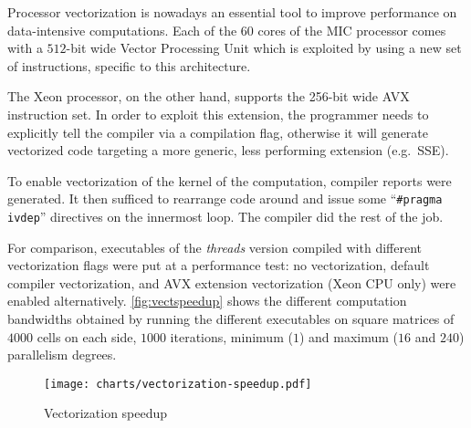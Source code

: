 \documentclass[a4paper,11pt]{article}
\newcommand{\code}[1]{\texttt{#1}}
\begin{document}
Processor vectorization is nowadays an essential tool to improve performance on data-intensive computations. Each of the $60$ cores of the MIC processor comes with a $512$-bit wide Vector Processing Unit which is exploited by using a new set of instructions, specific to this architecture.

The Xeon processor, on the other hand, supports the 256-bit wide AVX instruction set. In order to exploit this extension, the programmer needs to explicitly tell the compiler via a compilation flag, otherwise it will generate vectorized code targeting a more generic, less performing extension (e.g.\ SSE).

To enable vectorization of the kernel of the computation, compiler reports were generated. It then sufficed to rearrange code around and issue some ``\code{\#pragma ivdep}'' directives on the innermost loop. The compiler did the rest of the job.

For comparison, executables of the \emph{threads} version compiled with different vectorization flags were put at a performance test: no vectorization, default compiler vectorization, and AVX extension vectorization (Xeon CPU only) were enabled alternatively. \autoref{fig:vectspeedup} shows the different computation bandwidths obtained by running the different executables on square matrices of $4000$ cells on each side, $1000$ iterations, minimum ($1$) and maximum ($16$ and $240$) parallelism degrees.

\begin{figure}[hbtp]
\centering
\texttt{[image: charts/vectorization-speedup.pdf]}
\caption{Vectorization speedup} \label{fig:vectspeedup}
\end{figure}


\end{document}
